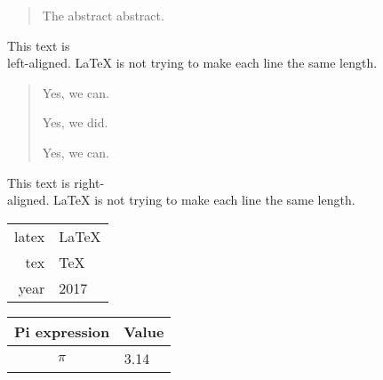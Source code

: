 \documentclass{report}
\begin{document}
\begin{abstract} 
The abstract abstract. 
\end{abstract}

\begin{flushleft} 
This text is\\ left-aligned. \LaTeX{} is not trying to make each line the same length. 
\end{flushleft}

\begin{quotation}
Yes, we can.

Yes, we did.

Yes, we can.
\end{quotation}


\begin{flushright}
This text is right-\\aligned. \LaTeX{} is not trying to make each line the same length. 
\end{flushright}

\begin{tabular}{|r|l|} 
\hline 
latex & \LaTeX \\
\cline{1-2}  
tex &\TeX\\ 
\hline \hline 
year & 2017 \\ 
\hline 
\end{tabular}

\begin{tabular}{c r @{.} l} 
Pi expression & 
\multicolumn{2}{c}{Value} \\ 
\hline
$\pi$ & 3.14 \\ 
\end{tabular}
\end{document}
